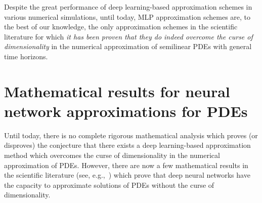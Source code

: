 \documentclass[12pt,AutoFakeBold,AutoFakeSlant]{article}
\theoremstyle{definition}
\begin{document}
	Despite the great performance of deep learning-based approximation schemes in various numerical simulations, 
	until today, MLP approximation schemes 
	are, to the best of our knowledge, 
	the only approximation schemes 
	in the scientific literature 
	for which 
	\emph{it has been proven that they 
	do indeed overcome the curse of dimensionality}  
	in the numerical approximation of semilinear PDEs with general time horizons. 





	\section{Mathematical results for neural network approximations for PDEs}


	Until today, there is no complete rigorous mathematical analysis 
	which proves (or disproves) the conjecture that there exists 
	a deep learning-based approximation method which overcomes the curse 
	of dimensionality in the numerical approximation of PDEs. 
	However, there are now a few mathematical results in the scientific literature 
	(see, e.g.,~\cite{berner2018analysis,elbrachter2018dnn,gonon2019uniform,grohs2018proof,grohs2019deep,hutzenthaler2020proof,jentzen2018proofarxiv1809,kutyniok2019theoretical,reisinger2019rectified,HornungJentzenSalimova2020}) which prove that deep neural networks have the capacity to approximate 
	solutions of PDEs without the curse of dimensionality. 
\end{document}
